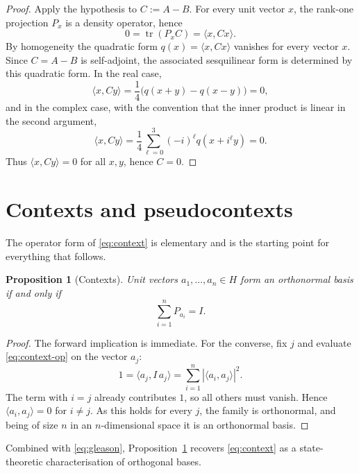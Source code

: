 \documentclass[
  twocolumn,
  aps,
  pra,
  floatfix,
  amsmath,amssymb,
  longbibliography
]{revtex4-2}
\newtheorem{proposition}[theorem]{Proposition}
\theoremstyle{definition}
\theoremstyle{remark}
\begin{document}
\begin{proof}
Apply the hypothesis to $C:=A-B$.  For every unit vector $x$, the
rank-one projection $P_x$ is a density operator, hence
\[
  0=\operatorname{tr}(P_xC)=\langle x,Cx\rangle .
\]
By homogeneity the quadratic form \(q(x)=\langle x,Cx\rangle\) vanishes for every vector \(x\). Since \(C=A-B\) is self-adjoint, the associated sesquilinear form is determined by this quadratic form. In the real case,
\[
\langle x,Cy\rangle
=\frac14\big(q(x+y)-q(x-y)\big)=0,
\]
and in the complex case, with the convention that the inner product is linear in the second argument,
\[
\langle x,Cy\rangle
=
\frac14\sum_{\ell=0}^{3}(-i)^\ell q(x+i^\ell y)=0.
\]
Thus \(\langle x,Cy\rangle=0\) for all \(x,y\), hence \(C=0\).
\end{proof}


\section{Contexts and pseudocontexts}

The operator form of \eqref{eq:context} is elementary and is the
starting point for everything that follows.

\begin{proposition}[Contexts]\label{prop:context}
Unit vectors $a_1,\ldots,a_n\in H$ form an orthonormal basis if and
only if
\begin{equation}
  \sum_{i=1}^{n}P_{a_i}=I.
  \label{eq:context-op}
\end{equation}
\end{proposition}

\begin{proof}
The forward implication is immediate.  For the converse, fix $j$ and
evaluate \eqref{eq:context-op} on the vector $a_j$:
\[
  1=\langle a_j,I\,a_j\rangle=\sum_{i=1}^{n}|\langle a_i,a_j\rangle|^2.
\]
The term with $i=j$ already contributes $1$, so all others must vanish.
Hence $\langle a_i,a_j\rangle=0$ for $i\neq j$.  As this holds for
every $j$, the family is orthonormal, and being of size $n$ in an
$n$-dimensional space it is an orthonormal basis.
\end{proof}

Combined with \eqref{eq:gleason}, Proposition~\ref{prop:context}
recovers \eqref{eq:context} as a state-theoretic characterisation of
orthogonal bases.
\end{document}
